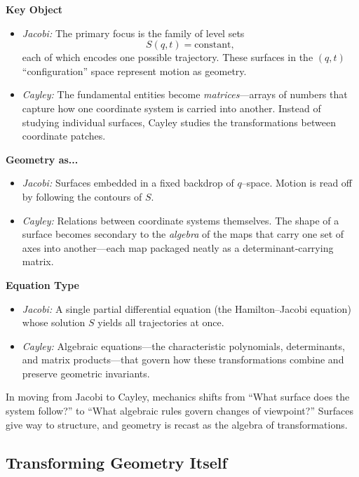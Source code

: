 \textbf{Key Object}  

\begin{itemize}
    \item \emph{Jacobi:} The primary focus is the family of level sets
    \[
    S(q,t) = \text{constant},
    \]
    each of which encodes one possible trajectory.  These surfaces in the \((q,t)\) “configuration” space represent motion as geometry.  

    \item \emph{Cayley:} The fundamental entities become \emph{matrices}—arrays of numbers that capture how one coordinate system is carried into another.  Instead of studying individual surfaces, Cayley studies the transformations between coordinate patches.
\end{itemize}

\textbf{Geometry as...}  

\begin{itemize}
    \item \emph{Jacobi:} Surfaces embedded in a fixed backdrop of \(q\)–space.  Motion is read off by following the contours of \(S\).  
    \item \emph{Cayley:} Relations between coordinate systems themselves.  The shape of a surface becomes secondary to the \emph{algebra} of the maps that carry one set of axes into another—each map packaged neatly as a determinant‐carrying matrix.
\end{itemize}

\textbf{Equation Type}  
\begin{itemize}
    \item \emph{Jacobi:} A single partial differential equation (the Hamilton–Jacobi equation) whose solution \(S\) yields all trajectories at once.  
    \item \emph{Cayley:} Algebraic equations—the characteristic polynomials, determinants, and matrix products—that govern how these transformations combine and preserve geometric invariants.
\end{itemize}

\medskip
In moving from Jacobi to Cayley, mechanics shifts from “What surface does the system follow?” to “What algebraic rules govern changes of viewpoint?”  Surfaces give way to structure, and geometry is recast as the algebra of transformations.  







\subsection{Transforming Geometry Itself}

